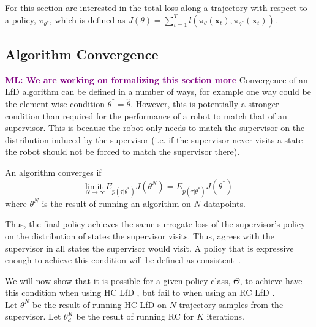 \documentclass[10pt, conference]{ieeeconf}      %
\newcommand{\bx}{\mathbf{x}}
\newcommand{\ns}{HC LfD }
\newcommand{\nc}{RC LfD }
\newcommand{\mlnote}[1]{\ifthenelse{ \boolean{include-notes}}%
 {\textcolor{purple}{\textbf{ML: #1}}}{}}
\begin{document}
For this section are interested in the total loss along a trajectory with respect to a policy, $\pi_{\theta^*}$, which is defined as $J(\theta) = \sum^T_{t=1} l(\pi_{\theta}(\bx_{t}),\pi_{\theta^*}(\bx_{t}))$. 

\subsection{Algorithm Convergence}
\mlnote{We are working on formalizing this section more}
Convergence of an LfD algorithm can be defined in a number of ways, for example one way could be the element-wise condition $\theta^* = \hat{\theta}$. However, this is potentially a stronger condition than required for the performance of a robot to match that of an supervisor.  This is because the robot only needs to match the supervisor on the distribution induced by the supervisor (i.e. if the supervisor never visits a state the robot should not be forced to match the supervisor there). 

An algorithm converges if
$$\underset{N \rightarrow \infty}{\text{limit }} E_{p(\tau|\theta^*)}J(\theta^N)  = E_{p(\tau|\theta^*)}J(\theta^*) $$
\noindent where $\theta^N$ is the result of running an algorithm on $N$ datapoints.

Thus, the final policy achieves the same surrogate loss of the supervisor's policy on the distribution of states the supervisor visits. Thus, agrees with the supervisor in all states the supervisor would visit.  A policy that is expressive enough to achieve this condition will be defined as consistent~\cite{vapnik1992principles}.

We will now show that it is possible for a given policy class, $\Theta$, to achieve have this condition when using \ns , but fail to when using an \nc. \\
Let $\theta^N$ be the result of running \ns on $N$ trajectory samples from the supervisor.
Let $\theta_{d}^K$ be the result of running RC for $K$ iterations.
\end{document}
